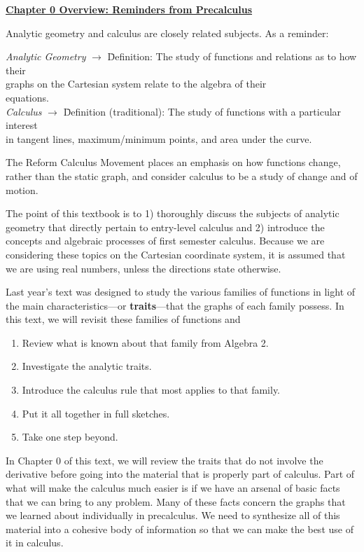 \textbf{\underline{\large{Chapter 0 Overview: Reminders from Precalculus}}} \par

Analytic geometry and calculus are closely related subjects. As a reminder: \par

\begin{tcolorbox}[definition]
    \begin{tabbing}
        \textit{Analytic Geometry} $\rightarrow$ \= Definition: The study of functions and relations as to how their \\ 
        \> graphs on the Cartesian system relate to the algebra of their \\
        \> equations. \\[5.5pt]
        \textit{Calculus} $\rightarrow$ \= Definition (traditional): The study of functions with a particular interest \\
        \> in tangent lines, maximum/minimum points, and area under the curve.
    \end{tabbing}
\end{tcolorbox}

The Reform Calculus Movement places an emphasis on how functions change, rather than the static graph, and consider calculus to be a study of change and of motion.

The point of this textbook is to 1) thoroughly discuss the subjects of analytic geometry that directly pertain to entry-level calculus and 2) introduce the concepts and algebraic processes of first semester calculus. Because we are considering these topics on the Cartesian coordinate system, it is assumed that we are using real numbers, unless the directions state otherwise.

Last year's text was designed to study the various families of functions in light of the main characteristics---or \textbf{traits}---that the graphs of each family possess.
In this text, we will revisit these families of functions and \begin{enumerate}
    \item Review what is known about that family from Algebra 2.
    \item Investigate the analytic traits.
    \item Introduce the calculus rule that most applies to that family.
    \item Put it all together in full sketches.
    \item Take one step beyond.
\end{enumerate}

In Chapter 0 of this text, we will review the traits that do not involve the derivative before going into the material that is properly part of calculus. Part of what will make the calculus much easier is if we have an arsenal of basic facts that we can bring to any problem. Many of these facts concern the graphs that we learned about individually in precalculus. We need to synthesize all of this material into a cohesive body of information so that we can make the best use of it in calculus.
